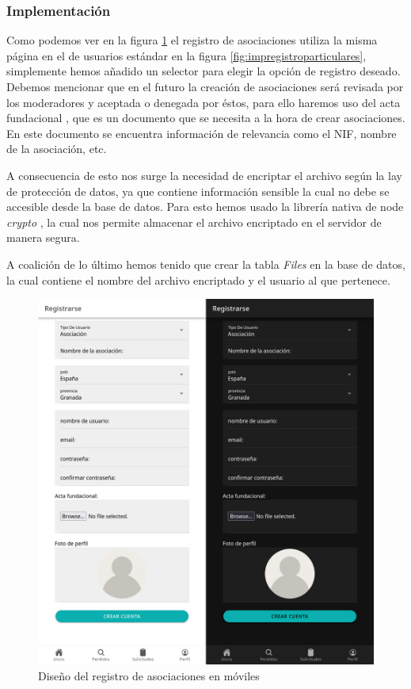 \subsubsection{Implementación}

Como podemos ver en la figura \ref{fig:impRegAso} el registro de asociaciones utiliza la misma página en el de usuarios estándar en la figura \ref{fig:impregistroparticulares}, simplemente hemos añadido un selector para elegir la opción de registro deseado. Debemos mencionar que en el futuro la creación de asociaciones será revisada por los moderadores y aceptada o denegada por éstos, para ello haremos uso del acta fundacional \cite{actaFundacional}, que es un documento que se necesita a la hora de crear asociaciones. En este documento se encuentra información de relevancia como el NIF, nombre de la asociación, etc.

A consecuencia de esto nos surge la necesidad de encriptar el archivo según la lay de protección de datos, ya que contiene información sensible la cual no debe se accesible desde la base de datos. Para esto hemos usado la librería nativa de node \textit{crypto} \cite{crypto}, la cual nos permite almacenar el archivo encriptado en el servidor de manera segura.

A coalición de lo último hemos tenido que crear la tabla \textit{Files} en la base de datos, la cual contiene el nombre del archivo encriptado y el usuario al que pertenece.

\begin{figure} [H]
	\centering
	\includegraphics[width=0.8\linewidth]{sprint 3//hu8/implementacion.png}
	\caption{Diseño del registro de asociaciones en móviles}
	\label{fig:impRegAso}
\end{figure}

